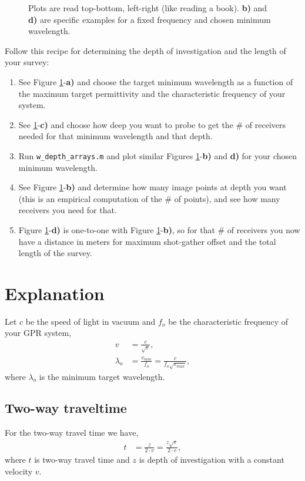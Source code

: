 \documentclass[a4paper,12pt]{article}
\begin{document}
\begin{figure}[!h]
\caption{Plots are read top-bottom, left-right (like reading a book). {\bf b)} and {\bf d)} are specific examples for a fixed frequency and chosen minimum wavelength.}
\label{fig:depth-length}
\end{figure}
%
%
Follow this recipe for determining the depth of investigation and the length of your survey:
\begin{enumerate}
\item See Figure \ref{fig:depth-length}-{\bf a)} and choose the target minimum wavelength as a function of the maximum target permittivity and the characteristic frequency of your system.
\item See \ref{fig:depth-length}-{\bf c)} and choose how deep you want to probe to get the \# of receivers needed for that minimum wavelength and that depth.
\item Run \texttt{w\_depth\_arrays.m} and plot similar Figures \ref{fig:depth-length}-{\bf b)} and {\bf d)} for your chosen minimum wavelength.
\item See Figure \ref{fig:depth-length}-{\bf b)} and determine how many image points at depth you want (this is an empirical computation of the \# of points), and see how many receivers you need for that.
\item Figure \ref{fig:depth-length}-{\bf d)} is one-to-one with Figure \ref{fig:depth-length}-{\bf b)}, so for that \# of receivers you now have a distance in meters for maximum shot-gather offset and the total length of the survey.
\end{enumerate}
%
\newpage
\section{Explanation}
Let $c$ be the speed of light in vacuum and $f_o$ be the characteristic frequency of your GPR system,
\begin{equation}
\begin{aligned}
v&=\frac{c}{\sqrt{\varepsilon}},\\
\lambda_o&=\frac{v_{min}}{f_o}=\frac{c}{f_o\sqrt{\varepsilon_{max}}},
\end{aligned}
\end{equation}
where $\lambda_o$ is the minimum target wavelength. 
\subsection{Two-way traveltime}
For the two-way travel time we have,
\begin{equation}
\begin{aligned}
t&=\frac{z}{2\cdot v}=\frac{z\sqrt{\varepsilon}}{2\cdot c},
\end{aligned}
\end{equation}
where $t$ is two-way travel time and $z$ is depth of investigation with a constant velocity $v$.
\end{document}
